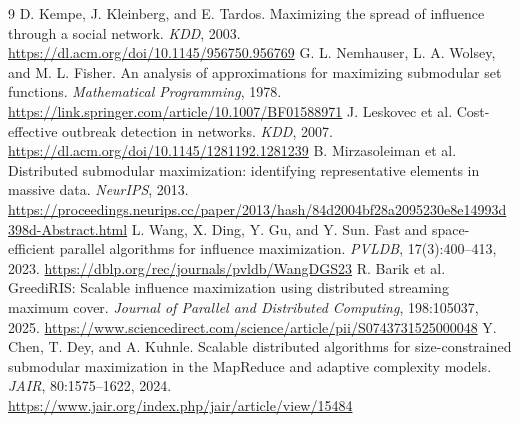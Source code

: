 \documentclass[10pt]{ctexart}
\begin{document}
\begingroup
\small
\setlength{\parskip}{0pt}
\begin{thebibliography}{9}
\setlength{\itemsep}{0pt}
\setlength{\parsep}{0pt}
\setlength{\parskip}{0pt}
 D. Kempe, J. Kleinberg, and E. Tardos. Maximizing the spread of influence through a social network. \emph{KDD}, 2003. \url{https://dl.acm.org/doi/10.1145/956750.956769}
 G. L. Nemhauser, L. A. Wolsey, and M. L. Fisher. An analysis of approximations for maximizing submodular set functions. \emph{Mathematical Programming}, 1978. \url{https://link.springer.com/article/10.1007/BF01588971}
 J. Leskovec et al. Cost-effective outbreak detection in networks. \emph{KDD}, 2007. \url{https://dl.acm.org/doi/10.1145/1281192.1281239}
 B. Mirzasoleiman et al. Distributed submodular maximization: identifying representative elements in massive data. \emph{NeurIPS}, 2013. \url{https://proceedings.neurips.cc/paper/2013/hash/84d2004bf28a2095230e8e14993d398d-Abstract.html}
 L. Wang, X. Ding, Y. Gu, and Y. Sun. Fast and space-efficient parallel algorithms for influence maximization. \emph{PVLDB}, 17(3):400--413, 2023. \url{https://dblp.org/rec/journals/pvldb/WangDGS23}
 R. Barik et al. GreediRIS: Scalable influence maximization using distributed streaming maximum cover. \emph{Journal of Parallel and Distributed Computing}, 198:105037, 2025. \url{https://www.sciencedirect.com/science/article/pii/S0743731525000048}
 Y. Chen, T. Dey, and A. Kuhnle. Scalable distributed algorithms for size-constrained submodular maximization in the MapReduce and adaptive complexity models. \emph{JAIR}, 80:1575--1622, 2024. \url{https://www.jair.org/index.php/jair/article/view/15484}
\end{thebibliography}
\endgroup
\end{document}
